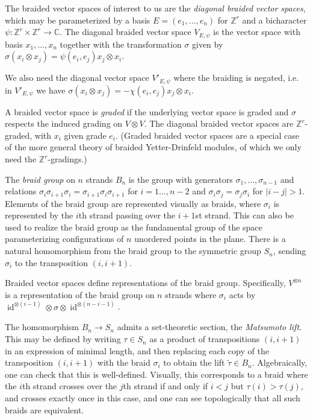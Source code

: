 \documentclass[11pt,letterpaper]{article}
\theoremstyle{definition}
\theoremstyle{remark}
\numberwithin{equation}{section}
\theoremstyle{dotless}
\newcommand{\hchi}{\psi} %
\renewcommand{\tilde}{\widetilde}
\begin{document}
The braided vector spaces of interest to us are the \emph{diagonal braided vector spaces}, which may be parameterized by a basis $E=(e_1,\dots, e_n)$ for $\mathbb Z^r$ and a bicharacter $\hchi \colon \mathbb Z^r \times \mathbb Z^r \to \mathbb C$. The diagonal braided vector space $V_{E,\hchi}$ is the vector space with basis $x_1,\dots, x_n$ together with the transformation $\sigma$ given by $\sigma(x_i \otimes x_j) = \hchi(e_i,e_j) x_j \otimes x_i$. 

We also need the diagonal vector space $V'_{E,\hchi}$ where the braiding is negated, i.e. in $V'_{E,\hchi}$ we have $\sigma(x_i \otimes x_j) = - \chi(e_i,e_j) x_j \otimes x_i$.

A braided vector space is \emph{graded} if the underlying vector space is graded and $\sigma$ respects the induced grading on $V \otimes V$. The diagonal braided vector spaces are $\mathbb Z^r$-graded, with $x_i$ given grade $e_i$. (Graded braided vector spaces are a special case of the more general theory of braided Yetter-Drinfeld modules, of which we only need the $\mathbb Z^r$-gradings.)

The \emph{braid group} on $n$ strands $B_n$ is the group with generators $\sigma_1,\dots, \sigma_{n-1}$ and relations $\sigma_i \sigma_{i+1} \sigma_i=\sigma_{i+1} \sigma_i \sigma_{i+1}$ for $i=1\dots, n-2$ and $\sigma_i \sigma_j = \sigma_j \sigma_i$ for $|i-j|>1$. Elements of the braid group are represented visually as braids, where $\sigma_i$ is represented by the $i$th strand passing over the $i+1$st strand. This can also be used to realize the braid group as the fundamental group of the space parameterizing configurations of $n$ unordered points in the plane. There is a natural homomorphism from the braid group to the symmetric group $S_n$, sending $\sigma_i$ to the transposition $(i,i+1)$.

Braided vector spaces define representations of the braid group. Specifically, $V^{\otimes n}$ is a representation of the braid group on $n$ strands where $\sigma_i$ acts by $\operatorname{id}^{\otimes (i-1)} \otimes \sigma \otimes \operatorname{id}^{\otimes (n-i-1)} $. 

The homomorphism $B_n \to S_n$ admits a set-theoretic section, the \emph{Matsumoto lift}. This may be defined by writing $\tau \in S_n$ as a product of transpositions $(i,i+1)$ in an expression of minimal length, and then replacing each copy of the transposition $(i,i+1)$ with the braid $\sigma_i$ to obtain the lift $\tilde{\tau} \in B_n$. Algebraically, one can check that this is well-defined. Visually, this corresponds to a braid where the $i$th strand crosses over the $j$th strand if and only if $i<j$ but $\tau(i)> \tau(j)$, and crosses exactly once in this case, and one can see topologically that all such braids are equivalent.
\end{document}
